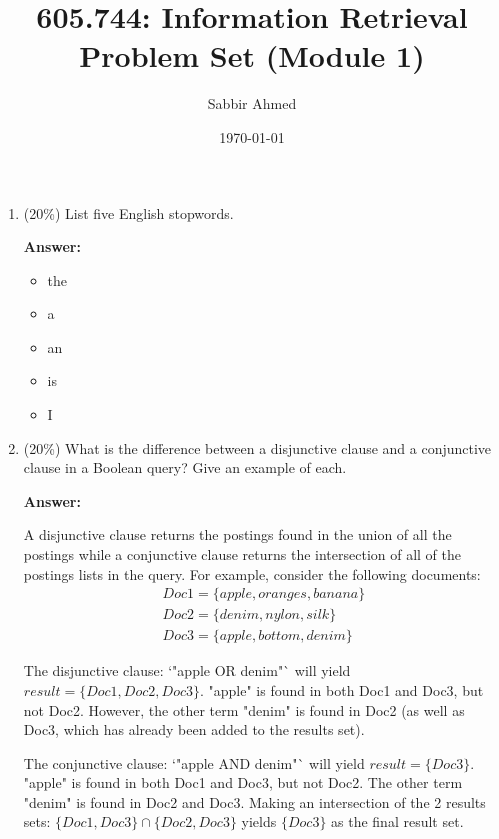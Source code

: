 \documentclass[11pt]{article}
\title{605.744: Information Retrieval \\ Problem Set (Module 1)}
\author{Sabbir Ahmed}
\date{\today}
\begin{document}
\maketitle	

    \begin{enumerate} %

        \item (20\%) List five English stopwords.
        
        \textbf{Answer:}
        
        \begin{itemize}
            \item the
            \item a
            \item an
            \item is
            \item I
        \end{itemize}
        
        \item (20\%) What is the difference between a disjunctive clause and a conjunctive clause in a Boolean query? Give an example of each.
        
        \textbf{Answer:}
        
        A disjunctive clause returns the postings found in the union of all the postings while a conjunctive clause returns the intersection of all of the postings lists in the query. For example, consider the following documents:
        \begin{equation*}
            \begin{split}
            Doc1 = \{apple, oranges, banana\} \\
            Doc2 = \{denim, nylon, silk\} \\
            Doc3 = \{apple, bottom, denim\}
            \end{split}
        \end{equation*}
        
        The disjunctive clause: `"apple OR denim"` will yield $result = \{Doc1, Doc2, Doc3\}$. "apple" is found in both Doc1 and Doc3, but not Doc2. However, the other term "denim" is found in Doc2 (as well as Doc3, which has already been added to the results set).
        
        The conjunctive clause: `"apple AND denim"` will yield $result = \{Doc3\}$. "apple" is found in both Doc1 and Doc3, but not Doc2. The other term "denim" is found in Doc2 and Doc3. Making an intersection of the 2 results sets: $\{Doc1, Doc3\} \cap \{Doc2, Doc3\}$ yields $\{Doc3\}$ as the final result set.
        

\end{enumerate}
\end{document}
